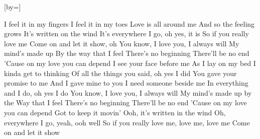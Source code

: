 [by={}]

\beginverse
I feel it in my fingers
I feel it in my toes
Love is all around me
And so the feeling grows
\endverse
\beginverse
It's written on the wind
It's everywhere I go, oh yes, it is
So if you really love me
Come on and let it show, oh
\endverse
\beginchorus
You know, I love you, I always will
My mind's made up
By the way that I feel
There's no beginning
There'll be no end
'Cause on my love you can depend
\endchorus
\beginverse
I see your face before me
As I lay on my bed
I kinda get to thinking
Of all the things you said, oh yes I did
\endverse
\beginverse
You gave your promise to me
And I gave mine to you
I need someone beside me
In everything and I do, oh yes I do
\endverse
\beginchorus
You know, I love you, I always will
My mind's made up by the
Way that I feel
There's no beginning
There'll be no end
'Cause on my love you can depend
\endchorus
\beginverse
Got to keep it movin'
Ooh, it's written in the wind
Oh, everywhere I go, yeah, ooh well
So if you really love me, love me, love me
Come on and let it show
\endverse


\endsong

